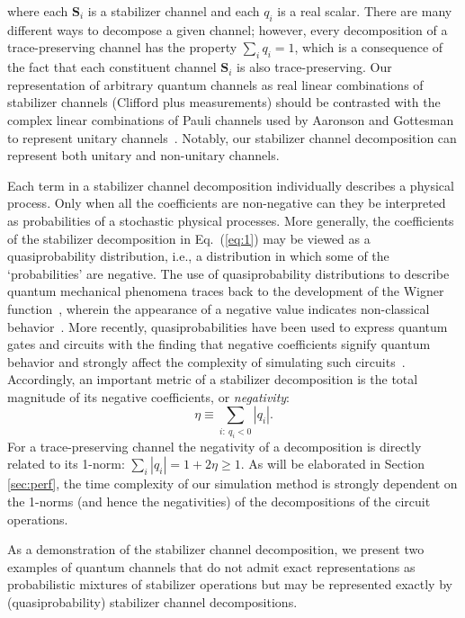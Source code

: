 \documentclass[twocolumn,pra]{revtex4}
\begin{document}
where each $\mathbf{S}_{i}$ is a stabilizer channel and each $ q_{i}$ is a real scalar. There are many different ways to decompose a given channel; however, every decomposition of a trace-preserving channel has the property $\sum_{i} q_{i}=1$, which is a consequence of the fact that each constituent channel $\mathbf{S}_{i}$ is also trace-preserving. Our representation of arbitrary quantum channels as real linear combinations of stabilizer channels (Clifford plus measurements) should be contrasted with the complex linear combinations of Pauli channels used by Aaronson and Gottesman to represent unitary channels~\cite{Aaronson2004}. Notably, our stabilizer channel decomposition can represent both unitary and non-unitary channels.
\par
Each term in a stabilizer channel decomposition individually describes a physical process. Only when all the coefficients are non-negative can they be interpreted as probabilities of a stochastic physical processes. More generally, the coefficients of the stabilizer decomposition in Eq.~(\ref{eq:1}) may be viewed as a quasiprobability distribution, i.e., a distribution in which some of the `probabilities' are negative. The use of quasiprobability distributions to describe quantum mechanical phenomena traces back to the development of the Wigner function~\cite{wigner1932quantum}, wherein the appearance of a negative value indicates non-classical behavior~\cite{kenfack2004negativity}. More recently, quasiprobabilities have been used to express quantum gates and circuits with the finding that negative coefficients signify quantum behavior and strongly affect the complexity of simulating such circuits~\cite{Hofmann2009, Pashayan2015}. Accordingly, an important metric of a stabilizer decomposition is the total magnitude of its negative coefficients, or \emph{negativity}:
\begin{equation}
\label{eq:eta}
\eta \equiv \sum_{i:\  q_i<0} \left|  q_i \right|.
\end{equation}
For a trace-preserving channel the negativity of a decomposition is directly related to its 1-norm:  $\sum_{i} \left| q_i \right| = 1 + 2 \eta \ge 1$. As will be elaborated in Section \ref{sec:perf}, the time complexity of our simulation method is strongly dependent on the 1-norms (and hence the negativities) of the decompositions of the circuit operations.
\par
As a demonstration of the stabilizer channel decomposition, we present two examples of quantum channels that do not admit exact representations as probabilistic mixtures of stabilizer operations but may be represented exactly by (quasiprobability) stabilizer channel decompositions. 
\end{document}
